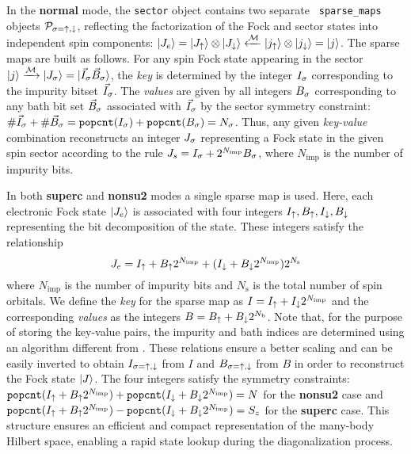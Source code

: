 \documentclass[edipack_sp.tex]{subfiles}
\begin{document}
In the {\bf normal} mode, the {\tt sector} object contains two separate {\tt
  sparse\_maps} objects ${\cal P}_{\sigma=\uparrow,\downarrow}$, reflecting the
factorization of the Fock and sector states into independent spin components: 
$|J_e\rangle=|J_\uparrow\rangle\otimes|J_\downarrow\rangle \xleftarrow{{\cal M}}
|j_\uparrow\rangle\otimes|j_\downarrow\rangle=|j\rangle$.
The sparse maps are built as follows. 
For any spin Fock state appearing in the sector $|j\rangle\xrightarrow{{\cal M}}|J_\sigma\rangle=|{\vec{I}_{\sigma}\vec{B}_{\sigma}}\rangle$,
the {\it key} is determined by the integer $I_\sigma$ corresponding to the
impurity bitset $\vec{I}_\sigma$. The {\it values} are given by all 
integers $B_\sigma$ corresponding to any bath bit set
$\vec{B}_\sigma$ associated with $\vec{I}_\sigma$ by the sector symmetry constraint: $\#\vec{I}_\sigma + \#\vec{B}_\sigma = \mathtt{popcnt}(I_\sigma) + \mathtt{popcnt}(B_\sigma)= N_\sigma$.
Thus, any given {\it key-value} combination 
reconstructs an integer $J_\sigma$ representing a Fock state in the
given spin sector according to the rule $J_s = I_\sigma +
2^{N_\mathrm{imp}}B_\sigma$, where $N_\mathrm{imp}$ is the number of impurity bits. 

In both {\bf superc} and {\bf nonsu2} modes a single sparse map is
used.
Here, each electronic Fock state $|J_e\rangle$ is associated with four integers $I_\uparrow, B_\uparrow, I_\downarrow,
B_\downarrow$ representing the bit decomposition of the state. 
These integers satisfy the relationship
\begin{equation}\label{spMapEq1}
J_e =I_\uparrow +  B_\uparrow2^{N_\mathrm{imp}} + (I_\downarrow +  B_\downarrow2^{N_\mathrm{imp}})2^{N_\mathrm{s}}
\end{equation}
where $N_\mathrm{imp}$ is the number of impurity bits and 
$N_\mathrm{s}$ is the total number of spin orbitals.
We define the \emph{key} for the sparse
map as $I=I_\uparrow + I_\downarrow2^{N_\mathrm{imp}}$ and the corresponding
\emph{values} as the integers $B=B_\uparrow + B_\downarrow2^{N_\mathrm{b}}$.
Note that, for the purpose of storing the key-value pairs, the impurity and bath indices are determined using an algorithm different from .   
These relations ensure a better scaling and can be easily inverted to obtain $I_{\sigma=\uparrow,\downarrow}$ from
$I$ and $B_{\sigma=\uparrow,\downarrow}$ from $B$ in order to reconstruct the Fock
state $|J\rangle$.
The four integers satisfy the symmetry constraints:   
$\mathtt{popcnt}(I_\uparrow + B_\uparrow2^{N_\mathrm{imp}}) + \mathtt{popcnt}(I_\downarrow + B_\downarrow2^{N_\mathrm{imp}}) = N$
for the \textbf{nonsu2} case and
$\mathtt{popcnt}(I_\uparrow + B_\uparrow2^{N_\mathrm{imp}}) - \mathtt{popcnt}(I_\downarrow + B_\downarrow2^{N_\mathrm{imp}}) = S_z$
for the \textbf{superc} case.
This structure ensures an efficient and compact representation 
of the many-body Hilbert space, enabling a rapid state lookup 
during the diagonalization process.
\end{document}
